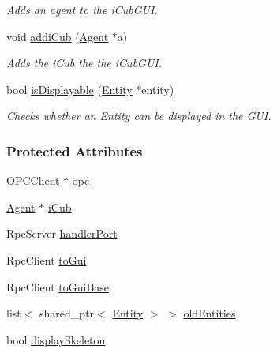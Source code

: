 \begin{DoxyCompactItemize}
\begin{DoxyCompactList}\small\item\em Adds an agent to the i\+Cub\+G\+UI. \end{DoxyCompactList}\item 
void \hyperlink{group__guiUpdater_ad83935ac90d7f0a3faf59baa3dd7658d}{addi\+Cub} (\hyperlink{group__icubclient__representations_classicubclient_1_1Agent}{Agent} $\ast$a)
\begin{DoxyCompactList}\small\item\em Adds the i\+Cub the the i\+Cub\+G\+UI. \end{DoxyCompactList}\item 
bool \hyperlink{group__guiUpdater_abc5325875147de98ff7af75d0f3b8dd8}{is\+Displayable} (\hyperlink{group__icubclient__representations_classicubclient_1_1Entity}{Entity} $\ast$entity)
\begin{DoxyCompactList}\small\item\em Checks whether an Entity can be displayed in the G\+UI. \end{DoxyCompactList}\end{DoxyCompactItemize}
\subsubsection*{Protected Attributes}
\begin{DoxyCompactItemize}
\item 
\hyperlink{group__icubclient__clients_classicubclient_1_1OPCClient}{O\+P\+C\+Client} $\ast$ \hyperlink{group__guiUpdater_a9e03b8ddad16217a222dd71e4aba7966}{opc}
\item 
\hyperlink{group__icubclient__representations_classicubclient_1_1Agent}{Agent} $\ast$ \hyperlink{group__guiUpdater_aa941eaa4ca5e07d0ea0fccc00a5f230a}{i\+Cub}
\item 
Rpc\+Server \hyperlink{group__guiUpdater_adb0e6936ecb65372a44aef8efe9cb2ad}{handler\+Port}
\item 
Rpc\+Client \hyperlink{group__guiUpdater_ac2c199bbf945af098d5bd2ddd909415e}{to\+Gui}
\item 
Rpc\+Client \hyperlink{group__guiUpdater_a78035e8447f5c04203916e9e727b2805}{to\+Gui\+Base}
\item 
list$<$ shared\+\_\+ptr$<$ \hyperlink{group__icubclient__representations_classicubclient_1_1Entity}{Entity} $>$ $>$ \hyperlink{group__guiUpdater_a44a33363b01d8799a3d48c9c0b14b200}{old\+Entities}
\item 
bool \hyperlink{group__guiUpdater_a4abe8ed2ee23b60de94d4055e90ef0aa}{display\+Skeleton}
\end{DoxyCompactItemize}



